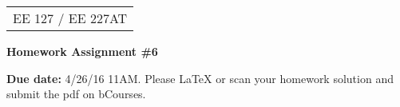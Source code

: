 \documentclass[12pt]{article}
\begin{document}


{\parindent 0pt
\begin{tabular}[t]{l}
EE 127 / EE 227AT \\
\end{tabular}}

\parindent 0pt
\parskip 8pt

\begin{center}
\large\bf Homework Assignment \#6
\end{center}

\bigskip

\noindent
{\bf Due date:}  4/26/16 11AM. Please \LaTeX{} or scan your homework solution and submit the pdf on bCourses.

\bigskip







 
\end{document}
